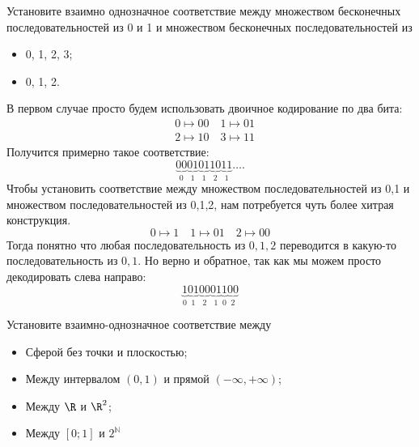 \documentclass[a4paper,12pt,twoside]{article}
\begin{document}
\begin{?}
    Установите взаимно однозначное соответствие между множеством бесконечных последовательностей из 0 и 1 и множеством бесконечных последовательностей из
    \begin{itemize}[noitemsep, topsep=0pt, parsep=3pt]
        \item  0, 1, 2, 3;
        \item 0, 1, 2.
    \end{itemize}
\end{?}
\begin{solution}{}
    В первом случае просто будем использовать двоичное кодирование по два бита:
    \begin{align*}
        & 0 \mapsto 00 \quad 1 \mapsto 01 \\
        & 2 \mapsto 10 \quad 3 \mapsto 11
    \end{align*}
    Получится примерно такое соответствие:
    $$
        \underbrace{00}_{0}\underbrace{01}_{1}\underbrace{01}_{1}\underbrace{10}_{2}\underbrace{11}_{1} \ldots.
    $$
    Чтобы установить соответствие между множеством последовательностей из 0,1 и множеством последовательностей из 0,1,2, нам потребуется чуть более хитрая конструкция.
    $$
        0 \mapsto 1 \quad 1 \mapsto 01 \quad 2 \mapsto 00
    $$
    Тогда понятно что любая последовательность из $0,1,2$ переводится в какую-то последовательность из $0, 1$. Но верно и обратное, так как мы можем просто декодировать слева направо:
    $$
        \underbrace{1}_{0} \underbrace{01}_1 \underbrace{00}_2 \underbrace{01}_1 \underbrace{1}_0 \underbrace{00}_2
    $$
\end{solution}
\begin{?}
    Установите взаимно-однозначное соответствие между
    \begin{itemize}[noitemsep, topsep=0pt, parsep=3pt]
        \item Сферой без точки и плоскостью;
        \item Между интервалом $(0, 1)$ и прямой $(-\infty, +\infty)$;
        \item Между $\R$ и $\R^2$;
        \item Между $[0; 1]$ и $2^{\mathbb{N}}$
    \end{itemize}
\end{?}
\end{document}
